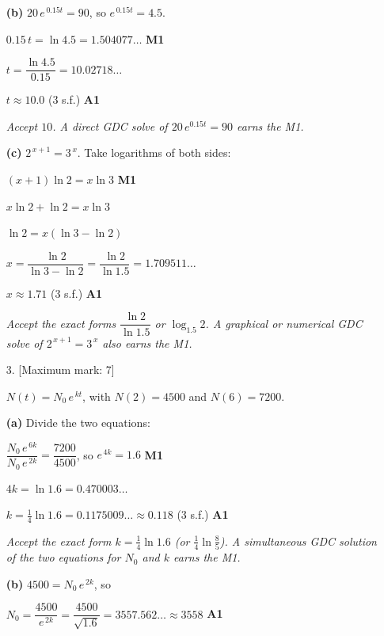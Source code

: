 \documentclass[12pt, twoside]{article}
\begin{document}
\begin{enumerate}[itemsep=0.3cm]
\medskip

\textbf{(b)} $20\, e^{\,0.15t} = 90$, so $e^{\,0.15t} = 4.5$.

$0.15\, t = \ln 4.5 = 1.504077\ldots$ \hfill \textbf{M1}

$t = \dfrac{\ln 4.5}{0.15} = 10.02718\ldots$

$t \approx 10.0$ (3 s.f.) \hfill \textbf{A1}

\emph{Accept $10$. A direct GDC solve of
$20\, e^{0.15t} = 90$ earns the M1.}

\medskip

\textbf{(c)} $2^{\,x+1} = 3^{\,x}$. Take logarithms of both sides:

$(x + 1)\ln 2 = x \ln 3$ \hfill \textbf{M1}

$x \ln 2 + \ln 2 = x \ln 3$

$\ln 2 = x(\ln 3 - \ln 2)$

$x = \dfrac{\ln 2}{\ln 3 - \ln 2} = \dfrac{\ln 2}{\ln 1.5}
= 1.709511\ldots$

$x \approx 1.71$ (3 s.f.) \hfill \textbf{A1}

\emph{Accept the exact forms $\dfrac{\ln 2}{\ln 1.5}$ or
$\log_{1.5} 2$. A graphical or numerical GDC solve of
$2^{\,x+1} = 3^{\,x}$ also earns the M1.}

\newpage

\item[3.] [Maximum mark: 7]

$N(t) = N_{0}\, e^{\,kt}$, with $N(2) = 4500$ and $N(6) = 7200$.

\medskip

\textbf{(a)} Divide the two equations:

$\dfrac{N_{0}\, e^{\,6k}}{N_{0}\, e^{\,2k}} = \dfrac{7200}{4500}$,
so $e^{\,4k} = 1.6$ \hfill \textbf{M1}

$4k = \ln 1.6 = 0.470003\ldots$

$k = \tfrac{1}{4}\ln 1.6 = 0.1175009\ldots \approx 0.118$ (3 s.f.)
\hfill \textbf{A1}

\emph{Accept the exact form $k = \frac{1}{4}\ln 1.6$ (or
$\frac{1}{4}\ln\frac{8}{5}$). A simultaneous GDC solution of
the two equations for $N_{0}$ and $k$ earns the M1.}

\medskip

\textbf{(b)} $4500 = N_{0}\, e^{\,2k}$, so

$N_{0} = \dfrac{4500}{e^{\,2k}} = \dfrac{4500}{\sqrt{1.6}}
= 3557.562\ldots \approx 3558$ \hfill \textbf{A1}


\end{enumerate}
\end{document}
